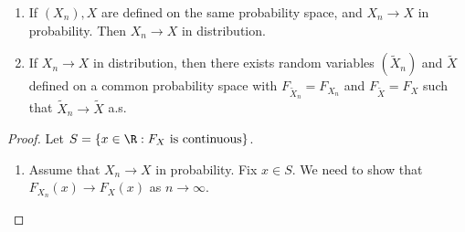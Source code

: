 \documentclass[a4paper]{article}
\begin{document}
\begin{thm}\leavevmode
  \begin{enumerate}
    \item If $(X_n), X$ are defined on the same probability space, and $X_n \to X$ in probability. Then $X_n \to X$ in distribution.
    \item If $X_n \to X$ in distribution, then there exists random variables $(\tilde{X}_n)$ and $\tilde{X}$ defined on a common probability space with $F_{\tilde{X}_n} = F_{X_n}$ and $F_{\tilde{X}} = F_X$ such that $\tilde{X}_n \to \tilde{X}$ a.s.
  \end{enumerate}
\end{thm}

\begin{proof}
  Let $S = \{x \in \R: F_X\text{ is continuous}\}$.
  \begin{enumerate}
    \item Assume that $X_n \to X$ in probability. Fix $x \in S$. We need to show that $F_{X_n}(x) \to F_X(x)$ as $n \to \infty$.


\end{enumerate}
\end{proof}
\end{document}
